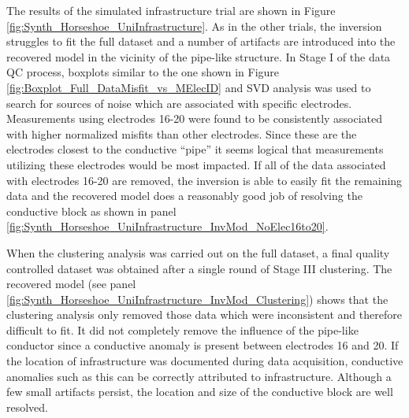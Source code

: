 \documentclass[final,authoryear,5p,times,twocolumn]{elsarticle}
\begin{document}
The results of the simulated infrastructure trial are shown in Figure \ref{fig:Synth_Horseshoe_UniInfrastructure}. As in the other trials, the inversion struggles to fit the full dataset and a number of artifacts are introduced into the recovered model in the vicinity of the pipe-like structure. In Stage I of the data QC process, boxplots similar to the one shown in Figure \ref{fig:Boxplot_Full_DataMisfit_vs_MElecID} and SVD analysis was used to search for sources of noise which are associated with specific electrodes. Measurements using electrodes 16-20 were found to be consistently associated with higher normalized misfits than other electrodes. Since these are the electrodes closest to the conductive ``pipe'' it seems logical that measurements utilizing these electrodes would be most impacted. If all of the data associated with electrodes 16-20 are removed, the inversion is able to easily fit the remaining data and the recovered model does a reasonably good job of resolving the conductive block as shown in panel \ref{fig:Synth_Horseshoe_UniInfrastructure_InvMod_NoElec16to20}.

When the clustering analysis was carried out on the full dataset, a final quality controlled dataset was obtained after a single round of Stage III clustering. The recovered model (see panel \ref{fig:Synth_Horseshoe_UniInfrastructure_InvMod_Clustering}) shows that the clustering analysis only removed those data which were inconsistent and therefore difficult to fit. It did not completely remove the influence of the pipe-like conductor since a conductive anomaly is present between electrodes 16 and 20. If the location of infrastructure was documented during data acquisition, conductive anomalies such as this can be correctly attributed to infrastructure. Although a few small artifacts persist, the location and size of the conductive block are well resolved.
\end{document}
